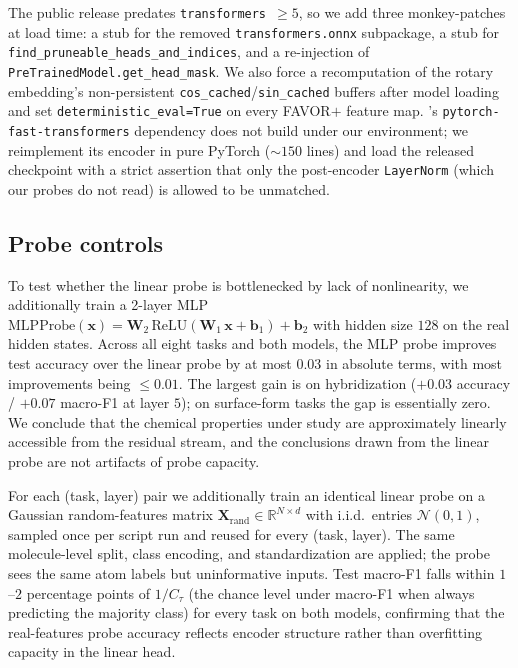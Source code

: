  The public \molm release predates \texttt{transformers}~$\geq 5$, so we add three monkey-patches at load time: a stub for the removed \texttt{transformers.onnx} subpackage, a stub for \texttt{find\_pruneable\_heads\_and\_indices}, and a re-injection of \texttt{PreTrainedModel.get\_head\_mask}. We also force a recomputation of the rotary embedding's non-persistent \texttt{cos\_cached}/\texttt{sin\_cached} buffers after model loading and set \texttt{deterministic\_eval=True} on every FAVOR$+$ feature map. \smi's \texttt{pytorch-fast-transformers} dependency does not build under our environment; we reimplement its encoder in pure PyTorch ($\sim 150$ lines) and load the released checkpoint with a strict assertion that only the post-encoder \texttt{LayerNorm} (which our probes do not read) is allowed to be unmatched.

\subsection{Probe controls}

 To test whether the linear probe is bottlenecked by lack of nonlinearity, we additionally train a 2-layer MLP $\mathrm{MLPProbe}(\mathbf{x}) = \mathbf{W}_2\,\mathrm{ReLU}(\mathbf{W}_1\,\mathbf{x} + \mathbf{b}_1) + \mathbf{b}_2$ with hidden size $128$ on the real hidden states. Across all eight tasks and both models, the MLP probe improves test accuracy over the linear probe by at most $0.03$ in absolute terms, with most improvements being $\leq 0.01$. The largest gain is on \molm hybridization ($+0.03$ accuracy / $+0.07$ macro-F1 at layer $5$); on surface-form tasks the gap is essentially zero. We conclude that the chemical properties under study are approximately linearly accessible from the residual stream, and the conclusions drawn from the linear probe are not artifacts of probe capacity.

 For each (task, layer) pair we additionally train an identical linear probe on a Gaussian random-features matrix $\mathbf{X}_{\mathrm{rand}} \in \mathbb{R}^{N \times d}$ with i.i.d.\ entries $\mathcal{N}(0, 1)$, sampled once per script run and reused for every (task, layer). The same molecule-level split, class encoding, and standardization are applied; the probe sees the same atom labels but uninformative inputs. Test macro-F1 falls within $1$--$2$ percentage points of $1/C_\tau$ (the chance level under macro-F1 when always predicting the majority class) for every task on both models, confirming that the real-features probe accuracy reflects encoder structure rather than overfitting capacity in the linear head.

